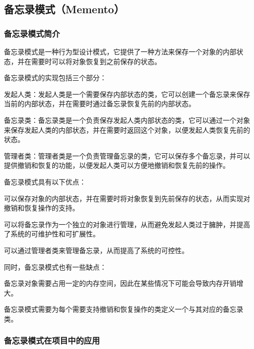 \subsection{备忘录模式（Memento）}

\subsubsection{备忘录模式简介}

备忘录模式是一种行为型设计模式，它提供了一种方法来保存一个对象的内部状态，并在需要时可以将对象恢复到之前保存的状态。

备忘录模式的实现包括三个部分：

发起人类：发起人类是一个需要保存内部状态的类，它可以创建一个备忘录来保存当前的内部状态，并在需要时通过备忘录恢复先前的内部状态。

备忘录类：备忘录类是一个负责保存发起人类内部状态的类，它可以通过一个对象来保存发起人类的内部状态，并在需要时返回这个对象，以便发起人类恢复先前的状态。

管理者类：管理者类是一个负责管理备忘录的类，它可以保存多个备忘录，并可以提供撤销和恢复的功能，以便发起人类可以方便地撤销和恢复先前的操作。

备忘录模式具有以下优点：

可以保存对象的内部状态，并在需要时将对象恢复到先前保存的状态，从而实现对撤销和恢复操作的支持。

可以将备忘录作为一个独立的对象进行管理，从而避免发起人类过于臃肿，并提高了系统的可维护性和可扩展性。

可以通过管理者类来管理备忘录，从而提高了系统的可控性。

同时，备忘录模式也有一些缺点：

备忘录对象需要占用一定的内存空间，因此在某些情况下可能会导致内存开销增大。

备忘录模式需要为每个需要支持撤销和恢复操作的类定义一个与其对应的备忘录类。

\subsubsection{备忘录模式在项目中的应用}

